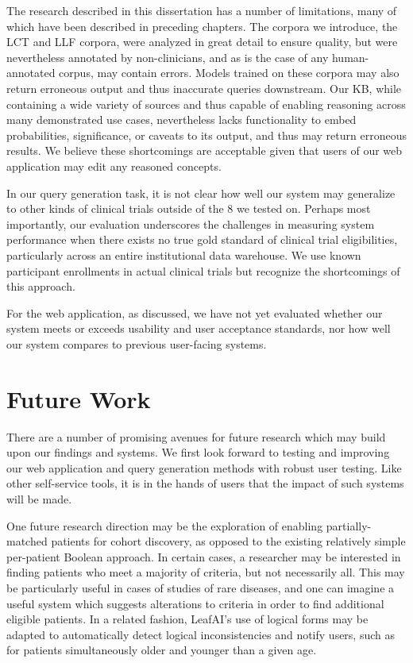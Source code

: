 \documentclass[../main.tex]{subfiles}
\begin{document}
The research described in this dissertation has a number of limitations, many of which have been described in preceding chapters. The corpora we introduce, the LCT and LLF corpora, were analyzed in great detail to ensure quality, but were nevertheless annotated by non-clinicians, and as is the case of any human-annotated corpus, may contain errors. Models trained on these corpora may also return erroneous output and thus inaccurate queries downstream. Our KB, while containing a wide variety of sources and thus capable of enabling reasoning across many demonstrated use cases, nevertheless lacks functionality to embed probabilities, significance, or caveats to its output, and thus may return erroneous results. We believe these shortcomings are acceptable given that users of our web application may edit any reasoned concepts. 

In our query generation task, it is not clear how well our system may generalize to other kinds of clinical trials outside of the 8 we tested on. Perhaps most importantly, our evaluation underscores the challenges in measuring system performance when there exists no true gold standard of clinical trial eligibilities, particularly across an entire institutional data warehouse. We use known participant enrollments in actual clinical trials but recognize the shortcomings of this approach.

For the web application, as discussed, we have not yet evaluated whether our system meets or exceeds usability and user acceptance standards, nor how well our system compares to previous user-facing systems. 

\section{Future Work}

There are a number of promising avenues for future research which may build upon our findings and systems. We first look forward to testing and improving our web application and query generation methods with robust user testing. Like other self-service tools, it is in the hands of users that the impact of such systems will be made.

One future research direction may be the exploration of enabling partially-matched patients for cohort discovery, as opposed to the existing relatively simple per-patient Boolean approach. In certain cases, a researcher may be interested in finding patients who meet a majority of criteria, but not necessarily all. This may be particularly useful in cases of studies of rare diseases, and one can imagine a useful system which suggests alterations to criteria in order to find additional eligible patients. In a related fashion, LeafAI's use of logical forms may be adapted to automatically detect logical inconsistencies and notify users, such as for patients simultaneously older and younger than a given age.
\end{document}
